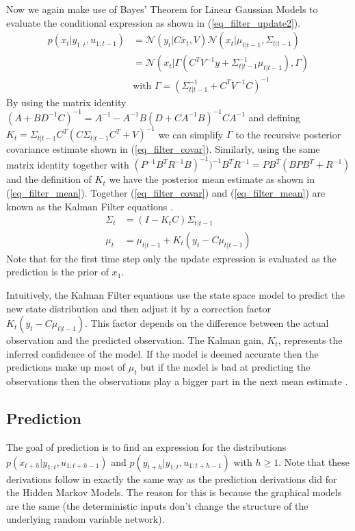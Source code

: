 Now we again make use of Bayes' Theorem for Linear Gaussian Models to evaluate the conditional expression as shown in (\ref{eq_filter_update2}).
\begin{equation}
\begin{aligned}
p(x_t|y_{1:t},u_{1:t-1}) &=\mathcal{N}(y_{t}|Cx_{t}, V)\mathcal{N}(x_t|\mu_{t|t-1},\Sigma_{t|t-1})\\ 
&= \mathcal{N}(x_t|\Gamma(C^TV^{-1}y + \Sigma_{t|t-1}^{-1}\mu_{t|t-1}), \Gamma) \\
&\text{with } \Gamma = (\Sigma_{t|t-1}^{-1}+C^TV^{-1}C)^{-1} 
\end{aligned}
\label{eq_filter_update2}
\end{equation} 
By using the matrix identity $(A+BD^{-1}C)^{-1}=A^{-1}-A^{-1}B(D+CA^{-1}B)^{-1}CA^{-1}$ and defining $K_t = \Sigma_{t|t-1}C^T(C\Sigma_{t|t-1}C^T+V)^{-1}$ we can simplify $\Gamma$ to the recursive posterior covariance estimate shown in (\ref{eq_filter_covar}). Similarly, using the same matrix identity together with $(P^{-1} B^TR^{-1}B)^{-1})^{-1}B^TR^{-1} = PB^T(BPB^T+R^{-1})$ and the definition of $K_t$ we have the posterior mean estimate as shown in (\ref{eq_filter_mean}). Together (\ref{eq_filter_covar}) and (\ref{eq_filter_mean}) are known as the Kalman Filter equations \cite{murphy2}.
\begin{align}
\Sigma_t &= (I-K_tC)\Sigma_{t|t-1} 
\label{eq_filter_covar} \\
\mu_t &= \mu_{t|t-1} + K_t(y_t - C\mu_{t|t-1})
\label{eq_filter_mean}
\end{align}
Note that for the first time step only the update expression is evaluated as the prediction is the prior of $x_1$. 

Intuitively, the Kalman Filter equations use the state space model to predict the new state distribution and then adjust it by a correction factor $K_t(y_t - C\mu_{t|t-1})$. This factor depends on the difference between the actual observation and the predicted observation. The Kalman gain, $K_t$, represents the inferred confidence of the model. If the model is deemed accurate then the predictions make up most of $\mu_t$ but if the model is bad at predicting the observations then the observations play a bigger part in the next mean estimate \cite{bishop}. 

\subsection{Prediction}
\label{sec_lin_prediction}
The goal of prediction is to find an expression for the distributions $p(x_{t+h}|y_{1:t}, u_{1:t+h-1})$ and $p(y_{t+h}|y_{1:t}, u_{1:t+h-1})$ with $h\geq 1$. Note that these derivations follow in exactly the same way as the prediction derivations did for the Hidden Markov Models. The reason for this is because the graphical models are the same (the deterministic inputs don't change the structure of the underlying random variable network). 

